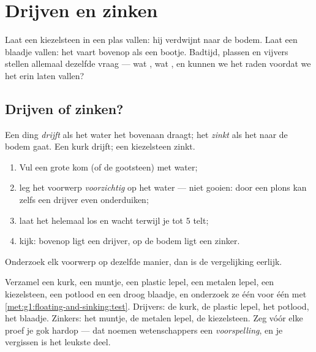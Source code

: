 \chapter{Drijven en zinken}\label{ch:g1:floating-and-sinking}

Laat een kiezelsteen in een plas vallen: hij verdwijnt naar de bodem.
Laat een blaadje vallen: het vaart bovenop als een bootje. Badtijd,
plassen en vijvers stellen allemaal dezelfde vraag --- wat
, wat , en kunnen we het raden voordat we het erin
laten vallen?

\section{Drijven of zinken?}

\begin{definition}\label{def:g1:floating-and-sinking:words}
Een ding \emph{drijft} als het water het bovenaan
draagt; het \emph{zinkt} als het naar de bodem gaat. Een
kurk drijft; een kiezelsteen zinkt.
\end{definition}

\begin{method}\label{met:g1:floating-and-sinking:test}
\begin{enumerate}
  \item Vul een grote kom (of de gootsteen) met water;
  \item leg het voorwerp \emph{voorzichtig} op het water --- niet
        gooien: door een plons kan zelfs een drijver even
        onderduiken;
  \item laat het helemaal los en wacht terwijl je tot $5$ telt;
  \item kijk: bovenop ligt een drijver, op de bodem ligt een zinker.
\end{enumerate}
Onderzoek elk voorwerp op dezelfde manier, dan is de vergelijking
eerlijk.
\end{method}

\begin{example}\label{ex:g1:floating-and-sinking:sorting}
Verzamel een kurk, een muntje, een plastic lepel, een metalen lepel,
een kiezelsteen, een potlood en een droog blaadje, en onderzoek ze één
voor één met \cref{met:g1:floating-and-sinking:test}. Drijvers: de
kurk, de plastic lepel, het potlood, het blaadje. Zinkers: het muntje,
de metalen lepel, de kiezelsteen. Zeg vóór elke proef je gok hardop
--- dat noemen wetenschappers een \emph{voorspelling}, en je vergissen
is het leukste deel.
\end{example}

